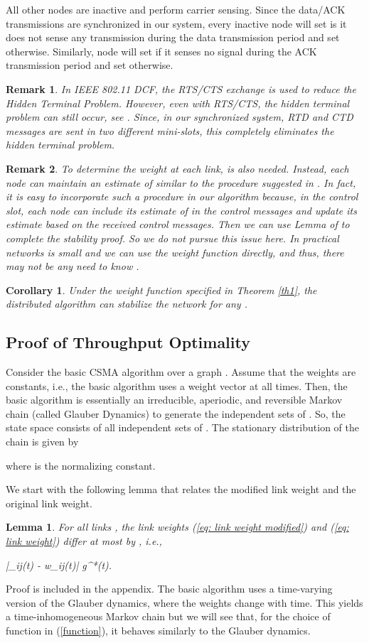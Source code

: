 \documentclass[10pt,onecolumn,draftclsnofoot,journal]{IEEEtran}
\newtheorem{lemma}{Lemma}
\newtheorem{corollary}{Corollary}
\newtheorem{remark}{Remark}
\newcommand{\be}{}
\begin{document}
All other nodes are inactive and perform carrier sensing. Since the data/ACK transmissions are synchronized in our system, every inactive node  will set  is it does not sense any transmission during the data transmission period and set  otherwise. Similarly, node  will set  if it senses
no signal during the ACK transmission period and set  otherwise.
\begin{remark}
In IEEE 802.11 DCF, the RTS/CTS exchange is used
to reduce the Hidden Terminal Problem. However, even with
RTS/CTS, the hidden terminal problem can still occur, see \cite{srikant2}. Since, in our synchronized system, RTD and CTD messages are sent in two different mini-slots, this completely eliminates the hidden terminal problem.
\end{remark}
\begin{remark}
To determine the weight at each link,  is also needed. Instead, each node can maintain an estimate of  similar to the procedure suggested in \cite{shah}. In fact, it is easy to incorporate such a procedure in our algorithm because, in the control slot, each node can include its estimate of  in the control messages and update its estimate based on the received control messages. Then we can use Lemma  of \cite{shah} to complete the stability proof. So we do not pursue this issue here. In practical networks  is small and we can use the weight function  directly, and thus, there may not be any need to know .
\end{remark}
\begin{corollary}\label{dis}
Under the weight function  specified in Theorem \ref{th1}, the distributed algorithm can stabilize the network for any .
\end{corollary}
\subsection{Proof of Throughput Optimality}\label{sec:csma_proofs}
Consider the basic CSMA algorithm over a graph . Assume that the weights are constants, i.e., the basic algorithm uses a weight vector  at all times. Then, the basic algorithm is essentially an irreducible, aperiodic, and reversible Markov chain (called Glauber Dynamics) to generate the independent sets of . So, the state space  consists of all independent sets of . The stationary distribution of the chain is given by

where  is the normalizing constant.

We start with the following lemma that relates the modified link weight and the original link weight.
\begin{lemma}\label{relate1}
For all links , the link weights (\ref{eq: link weight modified}) and (\ref{eq: link weight}) differ at most by , i.e.,
\be
|_{ij}(t) - w_{ij}(t)| \leq g^*(t).
\ee
\end{lemma}
Proof is included in the appendix.
The basic algorithm uses a time-varying version of the Glauber dynamics, where the weights change with time. This yields a time-inhomogeneous Markov chain but we will see that, for the choice of function  in (\ref{function}), it behaves similarly to the Glauber dynamics.
\end{document}
